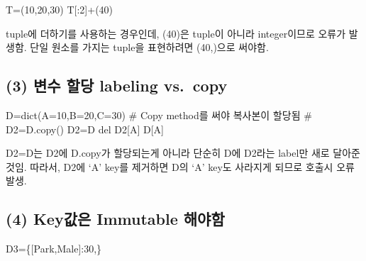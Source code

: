 \documentclass[
  letterpaper,
  DIV=11,
  numbers=noendperiod]{scrreprt}
\newenvironment{Shaded}{\begin{snugshade}}{\end{snugshade}}
\newcommand{\BuiltInTok}[1]{\textcolor[rgb]{0.00,0.23,0.31}{#1}}
\newcommand{\CommentTok}[1]{\textcolor[rgb]{0.37,0.37,0.37}{#1}}
\newcommand{\DecValTok}[1]{\textcolor[rgb]{0.68,0.00,0.00}{#1}}
\newcommand{\KeywordTok}[1]{\textcolor[rgb]{0.00,0.23,0.31}{#1}}
\newcommand{\NormalTok}[1]{\textcolor[rgb]{0.00,0.23,0.31}{#1}}
\newcommand{\OperatorTok}[1]{\textcolor[rgb]{0.37,0.37,0.37}{#1}}
\newcommand{\StringTok}[1]{\textcolor[rgb]{0.13,0.47,0.30}{#1}}
\begin{document}
\begin{Shaded}
\begin{Highlighting}[]
\NormalTok{T}\OperatorTok{=}\NormalTok{(}\DecValTok{10}\NormalTok{,}\DecValTok{20}\NormalTok{,}\DecValTok{30}\NormalTok{)}
\NormalTok{T[:}\DecValTok{2}\NormalTok{]}\OperatorTok{+}\NormalTok{(}\DecValTok{40}\NormalTok{)}
\end{Highlighting}
\end{Shaded}

tuple에 더하기를 사용하는 경우인데, (40)은 tuple이 아니라 integer이므로
오류가 발생함. 단일 원소를 가지는 tuple을 표현하려면 (40,)으로 써야함.

\subsection*{(3) 변수 할당 labeling
vs.~copy}\label{uxbcc0uxc218-uxd560uxb2f9-labeling-vs.-copy}

\begin{Shaded}
\begin{Highlighting}[]
\NormalTok{D}\OperatorTok{=}\BuiltInTok{dict}\NormalTok{(A}\OperatorTok{=}\DecValTok{10}\NormalTok{,B}\OperatorTok{=}\DecValTok{20}\NormalTok{,C}\OperatorTok{=}\DecValTok{30}\NormalTok{)}
\CommentTok{\# Copy method를 써야 복사본이 할당됨}
\CommentTok{\# D2=D.copy()}
\NormalTok{D2}\OperatorTok{=}\NormalTok{D}
\KeywordTok{del}\NormalTok{ D2[}\StringTok{\textquotesingle{}A\textquotesingle{}}\NormalTok{]}
\NormalTok{D[}\StringTok{\textquotesingle{}A\textquotesingle{}}\NormalTok{]}
\end{Highlighting}
\end{Shaded}

D2=D는 D2에 D.copy가 할당되는게 아니라 단순히 D에 D2라는 label만 새로
달아준것임. 따라서, D2에 `A' key를 제거하면 D의 `A' key도 사라지게
되므로 호출시 오류 발생.

\subsection*{(4) Key값은 Immutable
해야함}\label{keyuxac12uxc740-immutable-uxd574uxc57cuxd568}

\begin{Shaded}
\begin{Highlighting}[]
\NormalTok{D3}\OperatorTok{=}\NormalTok{\{[}\StringTok{\textquotesingle{}Park\textquotesingle{}}\NormalTok{,}\StringTok{\textquotesingle{}Male\textquotesingle{}}\NormalTok{]:}\DecValTok{30}\NormalTok{,\}}
\end{Highlighting}
\end{Shaded}
\end{document}

